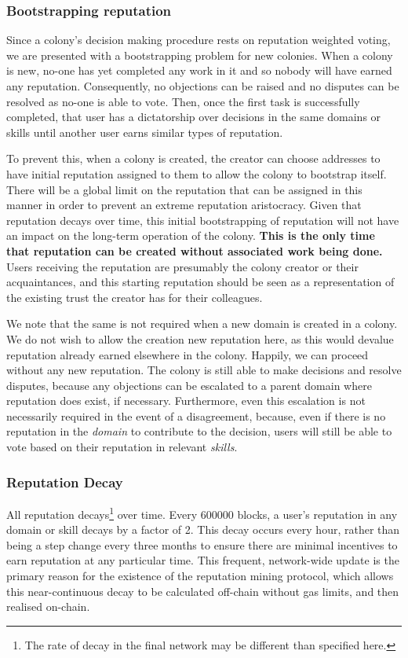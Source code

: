 \subsubsection{Bootstrapping reputation}\label{sec:bootstrapping-rep}
Since a colony's decision making procedure rests on reputation weighted voting, we are presented with a bootstrapping problem for new colonies. When a colony is new, no-one has yet completed any work in it and so nobody will have earned any reputation. Consequently, no objections can be raised and no disputes can be resolved as no-one is able to vote. Then, once the first task is successfully completed, that user has a dictatorship over decisions in the same domains or skills until another user earns similar types of reputation.

To prevent this, when a colony is created, the creator can choose addresses to have initial reputation assigned to them to allow the colony to bootstrap itself. There will be a global limit on the reputation that can be assigned in this manner in order to prevent an extreme reputation aristocracy. Given that reputation decays over time, this initial bootstrapping of reputation will not have an impact on the long-term operation of the colony. \textbf{This is the only time that reputation can be created without associated work being done.} Users receiving the reputation are presumably the colony creator or their acquaintances, and this starting reputation should be seen as a representation of the existing trust the creator has for their colleagues. 

We note that the same is not required when a new domain is created in a colony. We do not wish to allow the creation new reputation here, as this would devalue reputation already earned elsewhere in the colony. Happily, we can proceed without any new reputation. The colony is still able to make decisions and resolve disputes, because any objections can be escalated to a parent domain where reputation does exist, if necessary. Furthermore, even this escalation is not necessarily required in the event of a disagreement, because, even if there is no reputation in the \emph{domain} to contribute to the decision, users will still be able to vote based on their reputation in relevant \emph{skills}.

\subsubsection{Reputation Decay}
All reputation decays\footnote{The rate of decay in the final network may be different than specified here.} over time. Every 600000 blocks, a user's reputation in any domain or skill decays by a factor of 2. This decay occurs every hour, rather than being a step change every three months to ensure there are minimal incentives to earn reputation at any particular time. This frequent, network-wide update is the primary reason for the existence of the reputation mining protocol, which allows this near-continuous decay to be calculated off-chain without gas limits, and then realised on-chain. 


